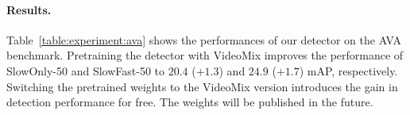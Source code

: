 

\paragraph{Results.}
Table~\ref{table:experiment:ava} shows the performances of our detector on the AVA benchmark. 
Pretraining the detector with VideoMix improves the performance of SlowOnly-50 and SlowFast-50 to $\mathbf{20.4}$ ($+\mathbf{1.3}$) and $\mathbf{24.9}$ ($+\mathbf{1.7}$) mAP, respectively. Switching the pretrained weights to the VideoMix version introduces the gain in detection performance for free. 
The weights will be published in the future.
